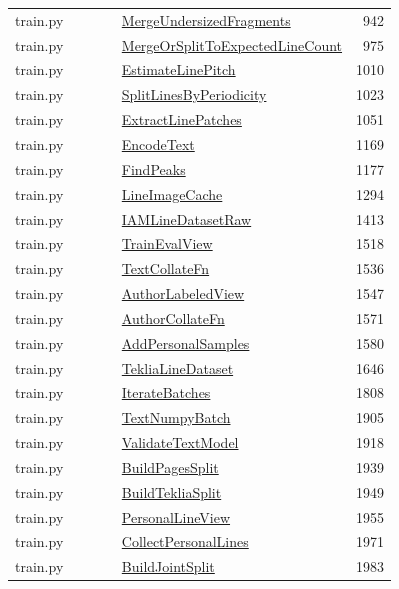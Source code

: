 \documentclass[11pt,a4paper,oneside]{report}
\begin{document}
\begin{longtable}{p{0.28\linewidth}p{0.48\linewidth}r}
train.py & \hyperref[fn:train:MergeUndersizedFragments]{MergeUndersizedFragments} & 942\\
train.py & \hyperref[fn:train:MergeOrSplitToExpectedLineCount]{MergeOrSplitToExpectedLineCount} & 975\\
train.py & \hyperref[fn:train:EstimateLinePitch]{EstimateLinePitch} & 1010\\
train.py & \hyperref[fn:train:SplitLinesByPeriodicity]{SplitLinesByPeriodicity} & 1023\\
train.py & \hyperref[fn:train:ExtractLinePatches]{ExtractLinePatches} & 1051\\
train.py & \hyperref[fn:train:EncodeText]{EncodeText} & 1169\\
train.py & \hyperref[fn:train:FindPeaks]{FindPeaks} & 1177\\
train.py & \hyperref[fn:train:LineImageCache]{LineImageCache} & 1294\\
train.py & \hyperref[fn:train:IAMLineDatasetRaw]{IAMLineDatasetRaw} & 1413\\
train.py & \hyperref[fn:train:TrainEvalView]{TrainEvalView} & 1518\\
train.py & \hyperref[fn:train:TextCollateFn]{TextCollateFn} & 1536\\
train.py & \hyperref[fn:train:AuthorLabeledView]{AuthorLabeledView} & 1547\\
train.py & \hyperref[fn:train:AuthorCollateFn]{AuthorCollateFn} & 1571\\
train.py & \hyperref[fn:train:AddPersonalSamples]{AddPersonalSamples} & 1580\\
train.py & \hyperref[fn:train:TekliaLineDataset]{TekliaLineDataset} & 1646\\
train.py & \hyperref[fn:train:IterateBatches]{IterateBatches} & 1808\\
train.py & \hyperref[fn:train:TextNumpyBatch]{TextNumpyBatch} & 1905\\
train.py & \hyperref[fn:train:ValidateTextModel]{ValidateTextModel} & 1918\\
train.py & \hyperref[fn:train:BuildPagesSplit]{BuildPagesSplit} & 1939\\
train.py & \hyperref[fn:train:BuildTekliaSplit]{BuildTekliaSplit} & 1949\\
train.py & \hyperref[fn:train:PersonalLineView]{PersonalLineView} & 1955\\
train.py & \hyperref[fn:train:CollectPersonalLines]{CollectPersonalLines} & 1971\\
train.py & \hyperref[fn:train:BuildJointSplit]{BuildJointSplit} & 1983\\

\end{longtable}
\end{document}
